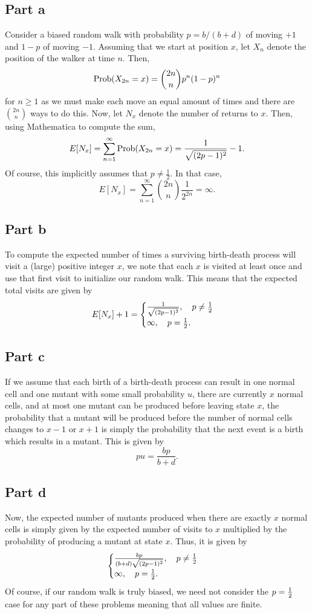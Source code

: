 \documentclass{article}
\begin{document}
\subsection{Part a}
Consider a biased random walk with probability $p=b/(b+d)$ of moving $+1$ and $1-p$ of moving $-1$. Assuming that we start at position $x$, let $X_n$ denote the position of the walker at time $n$. Then,
\[
\operatorname{Prob}(X_{2n}=x)=\binom{2n}{n}p^n(1-p)^n
\] 
for $n\geq1$ as we must make each move an equal amount of times and there are $\binom{2n}{n}$ ways to do this. Now, let $N_x$ denote the number of returns to $x$. Then, using Mathematica to compute the sum,
\[
E[N_x]=\sum_{n=1}^{\infty}\operatorname{Prob}(X_{2n}=x)=\frac{1}{\sqrt{(2p-1)^2}}-1.
\]
Of course, this implicitly assumes that $p\neq\frac{1}{2}$. In that case,
\[
E[N_x]=\sum_{n=1}^{\infty}\binom{2n}{n}\frac{1}{2^{2n}}=\infty.
\]

\subsection{Part b}
To compute the expected number of times a surviving birth-death process will visit a (large) positive integer $x$, we note that each $x$ is visited at least once and use that first visit to initialize our random walk. This means that the expected total visits are given by 
\[
E[N_x]+1=\begin{cases}
	\frac{1}{\sqrt{(2p-1)^2}}, \quad p\neq\mbox{$\frac{1}{2}$}\\
	\infty, \quad p=\mbox{$\frac{1}{2}$}.
\end{cases}
\]

\subsection{Part c}
If we assume that each birth of a birth-death process can result in one normal cell and one mutant with some small probability $u$, there are currently $x$ normal cells, and at most one mutant can be produced before leaving state $x$, the probability that a mutant will be produced before the number of normal cells changes to $x-1$ or $x+1$ is simply the probability that the next event is a birth which results in a mutant. This is given by
\[
pu=\frac{bp}{b+d}.
\]

\subsection{Part d}
Now, the expected number of mutants produced when there are exactly $x$ normal cells is simply given by the expected number of visits to $x$ multiplied by the probability of producing a mutant at state $x$. Thus, it is given by
\[
\begin{cases}
\frac{bp}{(b+d)\sqrt{(2p-1)^2}}, \quad p\neq\mbox{$\frac{1}{2}$}\\
\infty, \quad p=\mbox{$\frac{1}{2}$}.
\end{cases}
\]
Of course, if our random walk is truly biased, we need not consider the $p=\mbox{$\frac{1}{2}$}$ case for any part of these problems meaning that all values are finite. 
\end{document}
